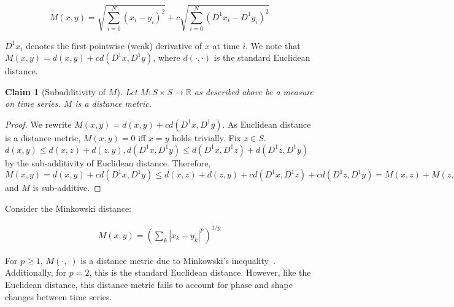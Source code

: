\documentclass[a4paper]{article}
\theoremstyle{def}
\theoremstyle{thm}
\newtheorem{claim}[proposition]{Claim}
\newcommand{\R}[0]{\mathbb{R}}
\begin{document}
\begin{equation}
    M(x,y) = \sqrt{\sum\limits_{i=0}^{N} (x_i - y_i)^2} + c\sqrt{\sum\limits_{i=0}^{N} ({D^1 x}_i - {D^1 y}_i)^2}
\end{equation}

$D^1 x_i$ denotes the first pointwise (weak) derivative of $x$ at time $i$.
We note that $M(x,y) = d(x,y) + c d(D^1 x, D^1 y)$, where $d(\cdot, \cdot)$ is the standard Euclidean distance.

\begin{claim}[Subadditivity of $M$]
    Let $M \colon S \times S \to \R$ as described above be a measure on time series.
    $M$ is a distance metric.
\end{claim}

\begin{proof}
    We rewrite $M(x,y) = d(x,y) + c d(D^1 x, D^1 y)$.
    As Euclidean distance is a distance metric, $M(x,y) = 0$ iff $x = y$ holds trivially.
    Fix $z \in S$.
    $d(x,y) \le d(x,z) + d(z,y), d(D^1 x, D^1 y) \le d(D^1 x, D^1 z) + d(D^1 z, D^1 y)$ by the sub-additivity of Euclidean distance.
    Therefore, $M(x,y) = d(x,y) + c d(D^1 x, D^1 y) \le d(x,z) + d(z,y) + c d(D^1 x, D^1 z) + c d(D^1 z, D^1 y) = M(x,z) + M(z,y)$ and $M$ is sub-additive.

\end{proof}





\iffalse
Consider the Minkowski distance:

\begin{align}
    M(x,y) = {(\sum\limits_k |x_k - y_k|^p)}^{1/p}
\end{align}

For $p \ge 1$, $M(\cdot,\cdot)$ is a distance metric due to Minkowski's inequality~\cite[p. 190]{wheeden15-measure}.
Additionally, for $p = 2$, this is the standard Euclidean distance.
However, like the Euclidean distance, this distance metric fails to account for phase and shape changes between time series.
\end{document}

